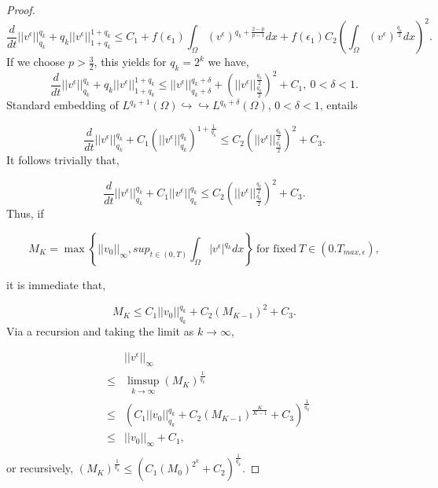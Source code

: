 \documentclass[10pt]{amsart}
\theoremstyle{plain}
\theoremstyle{definition}
\begin{document}
\begin{proof}
\begin{equation}
 \frac{d}{dt}||v^{\epsilon}||^{q_{k}}_{q_{k}} 
+q_{k}||v^{\epsilon}||^{1+q_{k}}_{1+q_{k}} 
 \leq C_{1} +  f(\epsilon_{1})\int_{\Omega} (v^{\epsilon})^{q_{k}+\frac{2-p}{p-1}}dx +  f(\epsilon_{1})C_{2} \left( \int_{\Omega} (v^{\epsilon})^{\frac{q_{k}}{2}}dx\right)^{2} .
\end{equation}
%
If we choose $p > \frac{3}{2}$, this yields for $q_{k} = 2^{k}$ we have, 
\begin{equation}
 \frac{d}{dt}||v^{\epsilon}||^{q_{k}}_{q_{k}} 
+q_{k}||v^{\epsilon}||^{1+q_{k}}_{1+q_{k}} 
 \leq  ||v^{\epsilon}||^{q_{k}+\delta}_{q_{k}+\delta}  + \left(||v^{\epsilon}||^{\frac{q_{k}}{2}}_{\frac{q_{k}}{2}}\right)^{2} + C_{1}, \ 0<\delta <1.
\end{equation}
%
Standard embedding of  $L^{q_{k}+1}(\Omega) \hookrightarrow  \hookrightarrow L^{q_{k}+\delta}(\Omega)$, $0<\delta <1$, entails


\begin{equation}
 \frac{d}{dt}||v^{\epsilon}||^{q_{k}}_{q_{k}} 
+C_{1}\left(||v^{\epsilon}||^{q_{k}}_{q_{k}} \right)^{1+\frac{1}{q_{k}}}
 \leq C_{2}\left(||v^{\epsilon}||^{\frac{q_{k}}{2}}_{\frac{q_{k}}{2}}\right)^{2} + C_{3}.
\end{equation}
%
It follows trivially that,

\begin{equation}
 \frac{d}{dt}||v^{\epsilon}||^{q_{k}}_{q_{k}} 
+C_{1}||v^{\epsilon}||^{q_{k}}_{q_{k}} 
 \leq C_{2}\left(||v^{\epsilon}||^{\frac{q_{k}}{2}}_{\frac{q_{k}}{2}}\right)^{2} + C_{3}.
\end{equation}
%
Thus, if 

\begin{equation}
M_{K} = \max \left\{||v_{0}||_{\infty}, sup_{t \in (0,T)} \int_{\Omega} |v^{\epsilon}|^{q_{k}} dx \right \} \ \mbox{for fixed} \ T \in (0.T_{max, \epsilon}),
\end{equation}

it is immediate that, 

\begin{equation}
M_{K} \leq C_{1} ||v_{0}||^{q_{k}}_{q_{k}} + C_{2} (M_{K-1})^{2} + C_{3}. 
\end{equation}
Via a recursion and taking the limit as $k \rightarrow \infty$, 


\begin{eqnarray}
&&||v^{\epsilon}||_{\infty}  \nonumber \\
&\leq& \limsup_{k \rightarrow \infty} (M_{K})^{\frac{1}{q_{k}}} \nonumber \\
&\leq& 
(C_{1}||v_{0}||^{q_{k}}_{q_{k}} + C_{2} (M_{K-1})^{\frac{K}{K-1}} + C_{3})^{\frac{1}{q_{k}}}  \nonumber \\
&\leq &
||v_{0}||_{\infty} + C_{1}, \nonumber \\
\end{eqnarray}
%
or recursively, $(M_{K})^{\frac{1}{q_{k}}} \leq \left(C_{1}(M_{0})^{2^{k}}+C_{2}\right)^{\frac{1}{q_{k}}} $.


\end{proof}
\end{document}
